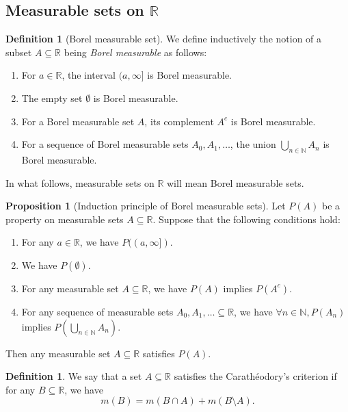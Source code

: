 \documentclass{article}
\theoremstyle{definition}
\newtheorem{proposition}[theorem]{Proposition}
\newtheorem{definition}[theorem]{Definition}
\begin{document}
\subsection{Measurable sets on $\mathbb{R}$}

\begin{definition}[Borel measurable set]
  We define inductively the notion of a subset $A \subseteq \mathbb{R}$ being 
  \emph{Borel measurable} as follows:
  \begin{enumerate}
    \item For $a \in \mathbb{R}$, the interval $(a,\infty]$ is Borel measurable.
    \item The empty set $\emptyset$ is Borel measurable.
    \item For a Borel measurable set $A$, its complement $A^c$ is Borel measurable.
    \item For a sequence of Borel measurable sets $A_0, A_1, \dots$, 
      the union $\bigcup_{n \in \mathbb{N}} A_n$ is Borel measurable.
  \end{enumerate}
\end{definition}

In what follows, measurable sets on $\mathbb{R}$ will mean Borel measurable sets.

\begin{proposition}[Induction principle of Borel measurable sets]
  Let $P(A)$ be a property on measurable sets $A \subseteq \mathbb{R}$.
  Suppose that the following conditions hold:
  \begin{enumerate}
    \item For any $a \in \mathbb{R}$, we have $P((a, \infty])$.
    \item We have $P(\emptyset)$.
    \item For any measurable set $A \subseteq \mathbb{R}$, we have $P(A)$ implies $P(A^c)$.
    \item For any sequence of measurable sets $A_0, A_1, \dots \subseteq \mathbb{R}$,
      we have $\forall n \in \mathbb{N}, P(A_n)$ implies $P\left(\bigcup_{n \in \mathbb{N}} A_n\right)$.  
  \end{enumerate}
  Then any measurable set $A \subseteq \mathbb{R}$ satisfies $P(A)$.
\end{proposition}

\begin{definition}
  We say that a set $A \subseteq \mathbb{R}$ satisfies 
  the Carath\'eodory's criterion if 
  for any $B \subseteq \mathbb{R}$, we have 
  \begin{equation*}
    m(B) = m(B \cap A) + m(B \setminus A).
  \end{equation*}
\end{definition}
\end{document}
